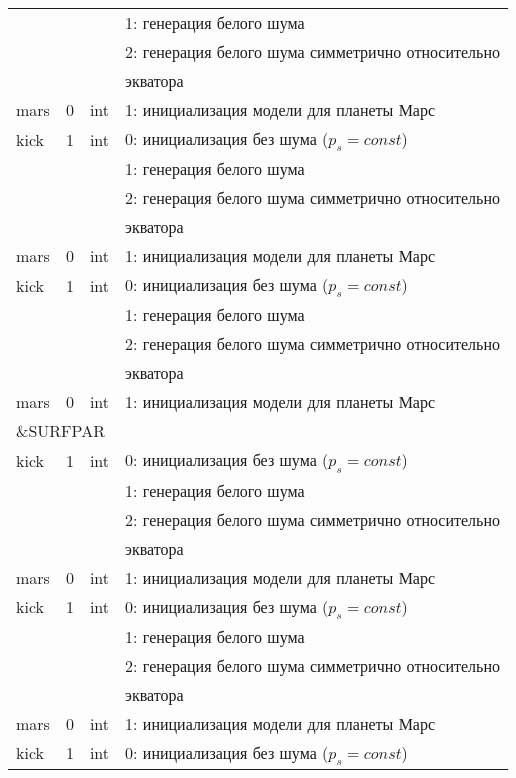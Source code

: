 \begin{longtable}[c]{|l|c|l|l|}
          &   &     & 1: генерация белого шума                  \\
          &   &     & 2: генерация белого шума симметрично относительно \\
      & & & экватора    \\
     mars & 0 & int & 1: инициализация модели для планеты Марс     \\
    kick & 1 & int & 0: инициализация без шума ($p_s = const$) \\
          &   &     & 1: генерация белого шума                  \\
          &   &     & 2: генерация белого шума симметрично относительно \\
      & & & экватора    \\
     mars & 0 & int & 1: инициализация модели для планеты Марс     \\
    kick & 1 & int & 0: инициализация без шума ($p_s = const$) \\
          &   &     & 1: генерация белого шума                  \\
          &   &     & 2: генерация белого шума симметрично относительно \\
      & & & экватора    \\
     mars & 0 & int & 1: инициализация модели для планеты Марс     \\
     \hline
     \multicolumn{4}{|l|}{\&SURFPAR}        \\ \hline
    kick & 1 & int & 0: инициализация без шума ($p_s = const$) \\
          &   &     & 1: генерация белого шума                  \\
          &   &     & 2: генерация белого шума симметрично относительно \\
      & & & экватора    \\
     mars & 0 & int & 1: инициализация модели для планеты Марс     \\
    kick & 1 & int & 0: инициализация без шума ($p_s = const$) \\
          &   &     & 1: генерация белого шума                  \\
          &   &     & 2: генерация белого шума симметрично относительно \\
      & & & экватора    \\
     mars & 0 & int & 1: инициализация модели для планеты Марс     \\
    kick & 1 & int & 0: инициализация без шума ($p_s = const$) \\

\end{longtable}
